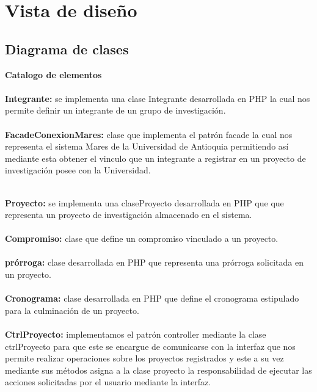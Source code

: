 \documentclass[12pt,oneside,letterpaper]{report}
\begin{document}
\section{Vista de diseño}

\subsection{Diagrama de clases}


\textbf{Catalogo de elementos}\\
\\
\textbf{Integrante:} se implementa una clase Integrante desarrollada en PHP la cual nos permite definir un integrante de un grupo de investigación.\\
\\
\textbf{FacadeConexionMares:} clase que implementa el patrón facade la cual nos representa el sistema Mares de la Universidad de Antioquia permitiendo así mediante esta obtener el vinculo que un integrante a registrar en un proyecto de investigación posee con la Universidad.\\
\\
\maketitle \textbf{Proyecto:} se implementa una claseProyecto desarrollada en PHP que que representa un proyecto de investigación almacenado en el sistema.\\
\\
\textbf{Compromiso:} clase que define un compromiso vinculado a un proyecto.\\
\\
\textbf{prórroga:} clase desarrollada en PHP que representa una prórroga solicitada en un proyecto.\\
\\
\textbf{Cronograma:} clase desarrollada en PHP que define el cronograma estipulado para la culminación de un proyecto.\\
\\
\textbf{CtrlProyecto:} implementamos el patrón controller mediante la clase ctrlProyecto para que este se encargue de comunicarse con la interfaz que nos permite realizar operaciones sobre los proyectos registrados y este a su vez mediante sus métodos asigna a la clase proyecto la responsabilidad de ejecutar las acciones solicitadas por el usuario mediante la interfaz.\\
\\
\end{document}
